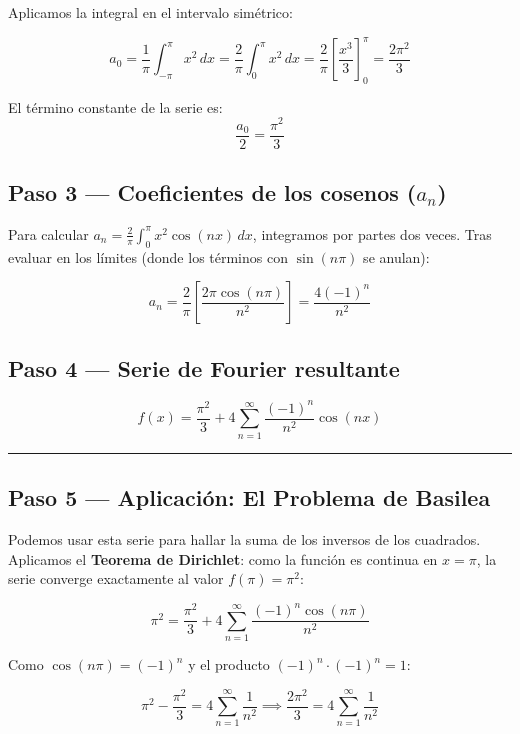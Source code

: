 \documentclass[
  letterpaper,
  DIV=11,
  numbers=noendperiod]{scrreprt}
\begin{document}
Aplicamos la integral en el intervalo simétrico:

\[
a_0 = \frac{1}{\pi}\int_{-\pi}^{\pi} x^2\,dx = \frac{2}{\pi}\int_0^{\pi} x^2\,dx = \frac{2}{\pi} \left[ \frac{x^3}{3} \right]_0^{\pi} = \frac{2\pi^2}{3}
\]

El término constante de la serie es: \[\frac{a_0}{2} = \frac{\pi^2}{3}\]

\subsection{\texorpdfstring{Paso 3 --- Coeficientes de los cosenos
(\(a_n\))}{Paso 3 --- Coeficientes de los cosenos (a\_n)}}\label{paso-3-coeficientes-de-los-cosenos-a_n-3}

Para calcular \(a_n = \frac{2}{\pi}\int_0^{\pi} x^2\cos(nx)\,dx\),
integramos por partes dos veces. Tras evaluar en los límites (donde los
términos con \(\sin(n\pi)\) se anulan):

\[
a_n = \frac{2}{\pi} \left[ \frac{2\pi\cos(n\pi)}{n^2} \right] = \frac{4(-1)^n}{n^2}
\]

\subsection{Paso 4 --- Serie de Fourier
resultante}\label{paso-4-serie-de-fourier-resultante-2}

\[
\boxed{f(x) = \frac{\pi^2}{3} + 4\sum_{n=1}^{\infty}\frac{(-1)^n}{n^2}\cos(nx)}
\]

\begin{center}\rule{0.5\linewidth}{0.5pt}\end{center}

\subsection{Paso 5 --- Aplicación: El Problema de
Basilea}\label{paso-5-aplicaciuxf3n-el-problema-de-basilea}

Podemos usar esta serie para hallar la suma de los inversos de los
cuadrados. Aplicamos el \textbf{Teorema de Dirichlet}: como la función
es continua en \(x = \pi\), la serie converge exactamente al valor
\(f(\pi) = \pi^2\):

\[
\pi^2 = \frac{\pi^2}{3} + 4\sum_{n=1}^{\infty}\frac{(-1)^n \cos(n\pi)}{n^2}
\]

Como \(\cos(n\pi) = (-1)^n\) y el producto \((-1)^n \cdot (-1)^n = 1\):

\[
\pi^2 - \frac{\pi^2}{3} = 4\sum_{n=1}^{\infty}\frac{1}{n^2} \implies \frac{2\pi^2}{3} = 4\sum_{n=1}^{\infty}\frac{1}{n^2}
\]
\end{document}
